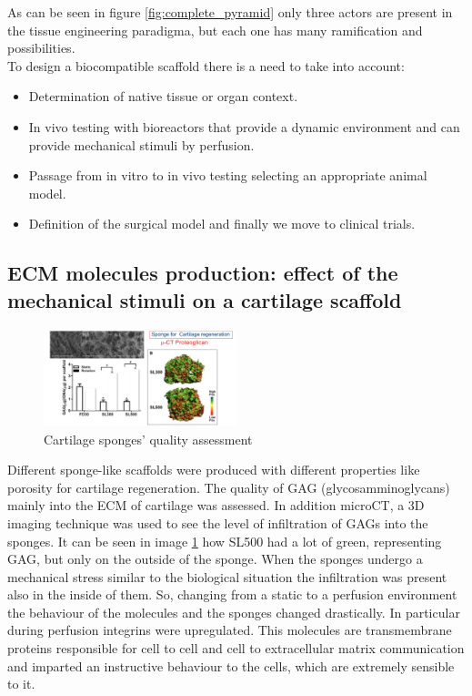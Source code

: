 As can be seen in figure \ref{fig:complete_pyramid} only three actors are present in the tissue engineering paradigma, but each one has many ramification and possibilities.
\\
To design a biocompatible scaffold there is a need to take into account:

\begin{multicols}{2}
	\begin{itemize}
		\item Determination of native tissue or organ context.
		\item In vivo testing with bioreactors that provide a dynamic environment and can provide mechanical stimuli by perfusion.
		\item Passage from in vitro to in vivo testing selecting an appropriate animal model.
		\item Definition of the surgical model and finally we move to clinical trials.
	\end{itemize}
\end{multicols}

	\subsection{ECM molecules production: effect of the mechanical stimuli on a cartilage scaffold}

	\begin{figure}[ht]
		\centering
		\includegraphics[width=0.5\textwidth]{sponge.png}
		\caption{Cartilage sponges' quality assessment}
		\label{fig:matrixome}
	\end{figure}

	Different sponge-like scaffolds were produced with different properties like porosity for cartilage regeneration.
	The quality of GAG (glycosamminoglycans) mainly into the ECM of cartilage was assessed.
	In addition microCT, a 3D imaging technique was used to see the level of infiltration of GAGs into the sponges.
	It can be seen in image \ref{fig:matrixome} how SL500 had a lot of green, representing GAG, but only on the outside of the sponge.
	When the sponges undergo a mechanical stress similar to the biological situation the infiltration was present also in the inside of them.
	So, changing from a static to a perfusion environment the behaviour of the molecules and the sponges changed drastically.
	In particular during perfusion integrins were upregulated.
	This molecules are transmembrane proteins responsible for cell to cell and cell to extracellular matrix communication and imparted an instructive behaviour to the cells, which are extremely sensible to it.
